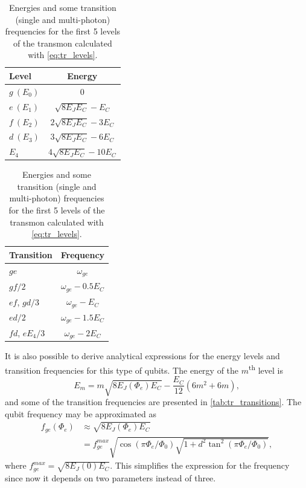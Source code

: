 \documentclass[%
 aip,
 draft,
 amsmath,amssymb,
 reprint,%
]{revtex4-1}
\begin{document}
\begin{table}
	\centering
	\begin{tabular}{l|c}
		Level & Energy\\
		\hline
		$g\ (E_0)$ & 0\\
		$e\ (E_1)$ & $\sqrt{8E_J E_C} - E_C$\\
		$f\ (E_2)$ & $2\sqrt{8E_J E_C} - 3 E_C$\\
		$d\ (E_3)$ & $3\sqrt{8E_J E_C} - 6 E_C$\\
		$E_4$ & $4\sqrt{8E_J E_C} - 10 E_C$\\
		\hline
	\end{tabular}\quad
	\begin{tabular}{l|c}
		Transition & Frequency\\
		\hline
		$ge$ & $\omega_{ge}$ \\
		$gf/2$ & $\omega_{ge} - 0.5 E_C$\\
		$ef$, $gd/3$& $\omega_{ge}-E_C$\\
		$ed/2$ & $\omega_{ge} - 1.5 E_C$\\
		$fd$, $e E_4/3$ & $\omega_{ge}-2 E_C$\\
		\hline
	\end{tabular}
	\caption{Energies and some transition (single and multi-photon) frequencies for the first 5 levels of the transmon calculated with \eqref{eq:tr_levels}.}
	\label{tab:tr_transitions}
\end{table}
It is also possible to derive analytical expressions for the energy levels and transition frequencies for this type of qubits. The energy of the $m$\textsuperscript{th} level is \cite{koch2007}
\begin{equation}
E_m = m \sqrt{8E_J(\Phi_e) E_C} -\frac{E_C}{12}(6m^2+6m),
\label{eq:tr_levels}
\end{equation}
and some of the transition frequencies are presented in \autoref{tab:tr_transitions}. The qubit frequency  may be approximated as 
\begin{equation}
\begin{aligned}
f_{ge}(\Phi_e) &\approx \sqrt{8 E_J (\Phi_e) E_C} \\
&= f_{ge}^{max} \sqrt{\cos\left(\pi \Phi_e/\Phi_0\right) \sqrt{1+d^2 \tan^2 \left(\pi \Phi_e/\Phi_0\right)}},
\end{aligned}
\end{equation}
where $f_{ge}^{max} = \sqrt{8 E_J(0) E_C}$. This simplifies the expression for the frequency since now it depends on two parameters instead of three.
\end{document}
